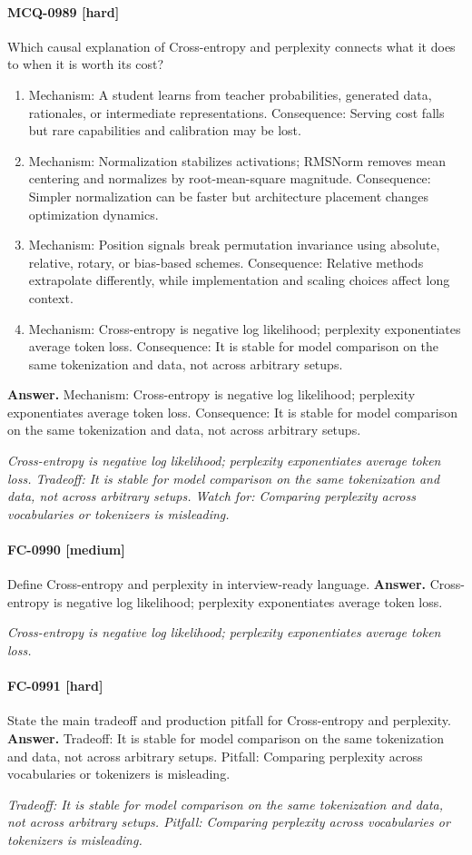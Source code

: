 \paragraph{MCQ-0989 [hard]} Which causal explanation of Cross-entropy and perplexity connects what it does to when it is worth its cost?
\begin{enumerate}[label=\Alph*.]
\item Mechanism: A student learns from teacher probabilities, generated data, rationales, or intermediate representations. Consequence: Serving cost falls but rare capabilities and calibration may be lost.
\item Mechanism: Normalization stabilizes activations; RMSNorm removes mean centering and normalizes by root-mean-square magnitude. Consequence: Simpler normalization can be faster but architecture placement changes optimization dynamics.
\item Mechanism: Position signals break permutation invariance using absolute, relative, rotary, or bias-based schemes. Consequence: Relative methods extrapolate differently, while implementation and scaling choices affect long context.
\item Mechanism: Cross-entropy is negative log likelihood; perplexity exponentiates average token loss. Consequence: It is stable for model comparison on the same tokenization and data, not across arbitrary setups.
\end{enumerate}
\noindent\textbf{Answer.} Mechanism: Cross-entropy is negative log likelihood; perplexity exponentiates average token loss. Consequence: It is stable for model comparison on the same tokenization and data, not across arbitrary setups.
\par\textit{Cross-entropy is negative log likelihood; perplexity exponentiates average token loss. Tradeoff: It is stable for model comparison on the same tokenization and data, not across arbitrary setups. Watch for: Comparing perplexity across vocabularies or tokenizers is misleading.}
\paragraph{FC-0990 [medium]} Define Cross-entropy and perplexity in interview-ready language.
\noindent\textbf{Answer.} Cross-entropy is negative log likelihood; perplexity exponentiates average token loss.
\par\textit{Cross-entropy is negative log likelihood; perplexity exponentiates average token loss.}
\paragraph{FC-0991 [hard]} State the main tradeoff and production pitfall for Cross-entropy and perplexity.
\noindent\textbf{Answer.} Tradeoff: It is stable for model comparison on the same tokenization and data, not across arbitrary setups. Pitfall: Comparing perplexity across vocabularies or tokenizers is misleading.
\par\textit{Tradeoff: It is stable for model comparison on the same tokenization and data, not across arbitrary setups. Pitfall: Comparing perplexity across vocabularies or tokenizers is misleading.}
